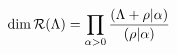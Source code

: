 \begin{equation}
{\rm dim}\, {\mathcal R}(\Lambda) = 
\prod_{\alpha > 0} \frac{(\Lambda + \rho | \alpha )}{(\rho | \alpha)}
\end{equation}

